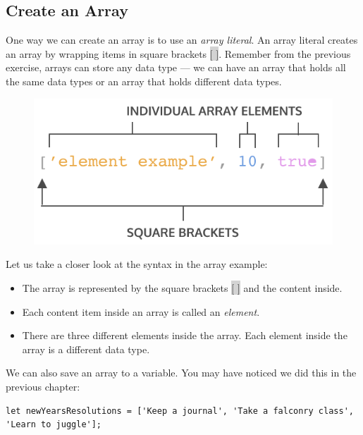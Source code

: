 \documentclass[11pt]{article}
\begin{document}
\subsection{Create an Array}
One way we can create an array is to use an \textit{array literal}. An array literal creates an array by wrapping items in square brackets \colorbox{lightgray}{$[$ $]$}. Remember from the previous exercise, arrays can store any data type — we can have an array that holds all the same data types or an array that holds different data types.
\begin{figure}[H]
\includegraphics[scale = 0.65]{6_1}
\centering
\end{figure}
Let us take a closer look at the syntax in the array example:
\begin{itemize}[leftmargin = *]
\item The array is represented by the square brackets \colorbox{lightgray}{$[$ $]$} and the content inside.
\item Each content item inside an array is called an \textit{element}.
\item There are three different elements inside the array.
Each element inside the array is a different data type.
\end{itemize}
We can also save an array to a variable. You may have noticed we did this in the previous chapter:
\begin{lstlisting}
let newYearsResolutions = ['Keep a journal', 'Take a falconry class', 'Learn to juggle'];
\end{lstlisting}
\end{document}

